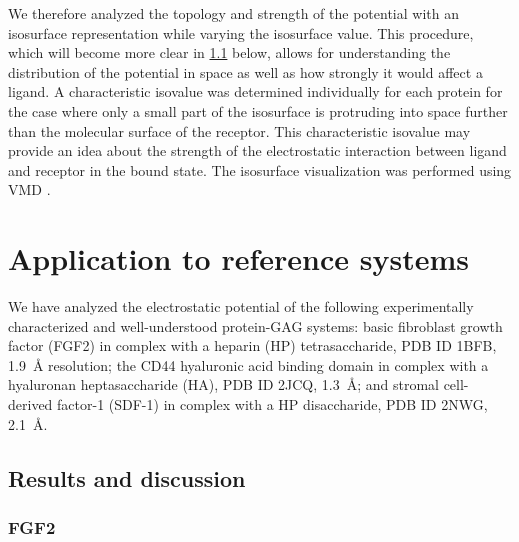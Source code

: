 We therefore analyzed the topology and strength of the potential with an
isosurface representation while varying the isosurface value. This procedure,
which will become more clear in \cref{bspred:appl_discussion} below, allows for
understanding the distribution of the potential in space as well as how strongly
it would affect a ligand. A characteristic isovalue was determined individually
for each protein for the case where only a small part of the isosurface is
protruding into space further than the molecular surface of the receptor. This
characteristic isovalue may provide an idea about the strength of the
electrostatic interaction between ligand and receptor in the bound state. The
isosurface visualization was performed using VMD \cite{vmd_1996}.


\section{Application to reference systems}
\label{bspred:application}

We have analyzed the electrostatic potential of the following experimentally
characterized and well-understood protein-GAG systems: basic fibroblast growth
factor (FGF2) in complex with a heparin (HP) tetrasaccharide, PDB ID 1BFB,
\SI{1.9}{\angstrom} resolution; the CD44 hyaluronic acid binding domain in
complex with a hyaluronan heptasaccharide (HA), PDB ID 2JCQ,
\SI{1.3}{\angstrom}; and stromal cell-derived factor-1 (SDF-1) in complex with a
HP disaccharide, PDB ID 2NWG, \SI{2.1}{\angstrom}.



\subsection{Results and discussion}
\label{bspred:appl_discussion}

\subsubsection{FGF2}


